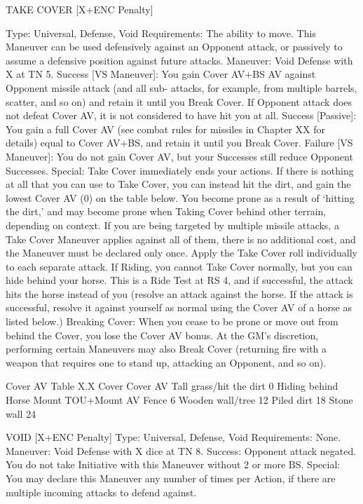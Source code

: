 \documentclass[oneside,11pt,english]{book}
\begin{document}
 

TAKE COVER [X+ENC Penalty] 


Type: Universal, Defense, Void 
Requirements: The ability to move. This Maneuver can be used defensively against an Opponent attack, 
or passively to assume a defensive position against future attacks. 
Maneuver: Void Defense with X at TN 5. 
Success [VS Maneuver]: You gain Cover AV+BS AV against Opponent missile attack (and all sub-
attacks, for example, from multiple barrels, scatter, and so on) and retain it until you Break Cover. If 
Opponent attack does not defeat Cover AV, it is not considered to have hit you at all. 
Success [Passive]: You gain a full Cover AV (see combat rules for missiles in Chapter XX for details) 
equal to Cover AV+BS, and retain it until you Break Cover. 
Failure [VS Maneuver]: You do not gain Cover AV, but your Successes still reduce Opponent Successes. 
Special: Take Cover immediately ends your actions. If there is nothing at all that you can use to Take 
Cover, you can instead hit the dirt, and gain the lowest Cover AV (0) on the table below. You become 
prone as a result of ‘hitting the dirt,’ and may become prone when Taking Cover behind other terrain, 
depending on context. 
If you are being targeted by multiple missile attacks, a Take Cover Maneuver applies against all of them, 
there is no additional cost, and the Maneuver must be declared only once. Apply the Take Cover roll 
individually to each separate attack. 
If Riding, you cannot Take Cover normally, but you can hide behind your horse. This is a Ride Test at RS 
4, and if successful, the attack hits the horse instead of you (resolve an attack against the horse. If the 
attack is successful, resolve it against yourself as normal using the Cover AV of a horse as listed below.) 
Breaking Cover: When you cease to be prone or move out from behind the Cover, you lose the Cover 
AV bonus. At the GM’s discretion, performing certain Maneuvers may also Break Cover (returning fire 
with a weapon that requires one to stand up, attacking an Opponent, and so on). 

 
Cover AV Table X.X 
Cover Cover AV 
Tall grass/hit the dirt 0 
Hiding behind Horse Mount TOU+Mount AV 
Fence 6 
Wooden wall/tree 12 
Piled dirt 18 
Stone wall 24 

 
VOID [X+ENC Penalty] 
Type: Universal, Defense, Void 
Requirements: None. 
Maneuver: Void Defense with X dice at TN 8. 
Success: Opponent attack negated. You do not take Initiative with this Maneuver without 2 or more BS. 
Special: You may declare this Maneuver any number of times per Action, if there are multiple incoming 
attacks to defend against. 
\end{document}
